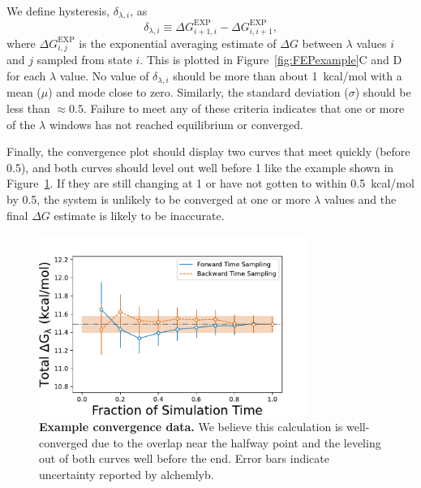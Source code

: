 \documentclass[9pt,tutorial]{Styling/livecoms}
\begin{document}
We define hysteresis, $\delta_{\lambda,i}$, as 
\begin{equation}\label{eq:hysteresis}
    \delta_{\lambda, i} \equiv \Delta G^\mathrm{EXP}_{i+1,i}-\Delta G^\mathrm{EXP}_{i,i+1},
\end{equation}
where $\Delta G^\mathrm{EXP}_{i,j}$ is the exponential averaging estimate of $\Delta G$ between $\lambda$ values $i$ and $j$ sampled from state $i$.
This is plotted in Figure~\ref{fig:FEPexample}C and D for each $\lambda$ value.
No value of $\delta_{\lambda,i}$ should be more than about 1~kcal/mol with a mean ($\mu$) and mode close to zero. 
Similarly, the standard deviation ($\sigma$) should be less than $\approx0.5$. 
Failure to meet any of these criteria indicates that one or more of the $\lambda$ windows has not reached equilibrium or converged.

Finally, the convergence plot should display two curves that meet quickly (before 0.5), and both curves should level out well before 1 like the example shown in Figure~\ref{fig:convergenceExample}. 
If they are still changing at 1 or have not gotten to within 0.5~\mbox{kcal/mol} by 0.5, the system is unlikely to be converged at one or more $\lambda$ values and the final $\Delta G$ estimate is likely to be inaccurate.

\begin{figure}[htb]
    \centering
    \includegraphics[width=250pt]{good_convergence}
    \caption{\textbf{Example convergence data.} We believe this calculation is well-converged due to the overlap near the halfway point and the leveling out of both curves well before the end. Error bars indicate uncertainty reported by alchemlyb.
    }\label{fig:convergenceExample}
\end{figure}
\end{document}
